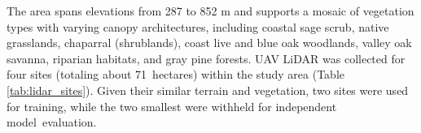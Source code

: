 \documentclass[remotesensing,article,accept,pdftex,moreauthors]{Definitions/mdpi}
\begin{document}
The area spans elevations from 287 to 852 m and supports a mosaic of vegetation types with varying canopy architectures, including coastal sage scrub, native grasslands, chaparral (shrublands), coast live and blue oak woodlands, valley oak savanna, riparian habitats, and gray pine forests. UAV LiDAR was collected for four sites (totaling about \mbox{71 hectares}) within the study area (Table \ref{tab:lidar_sites}). Given their similar terrain and vegetation, two sites were used for training, while the two smallest were withheld for independent \mbox{model evaluation}.



\end{document}

